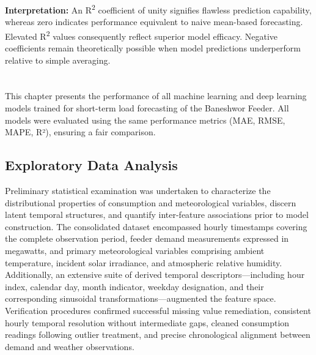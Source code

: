 \documentclass[oneside, 12pt]{book}
\numberwithin{equation}{chapter}
\newcommand{\sizexii}{\fontsize{12pt}{6pt}\selectfont}
\begin{document}
\textbf{Interpretation:} An R\textsuperscript{2} coefficient of unity signifies flawless prediction capability, whereas zero indicates performance equivalent to naive mean-based forecasting. Elevated R\textsuperscript{2} values consequently reflect superior model efficacy. Negative coefficients remain theoretically possible when model predictions underperform relative to simple averaging.




\chapter*{\vspace{-1in}\centering {\sizexii CHAPTER FOUR: RESULTS AND DISCUSSION}}
\setcounter{chapter}{4}
\setcounter{section}{0}
\setcounter{equation}{0}
\setcounter{figure}{0}
\setcounter{table}{0}
\vspace{-12pt}

This chapter presents the performance of all machine learning and deep learning models trained for short-term load forecasting of the Baneshwor Feeder. All models were evaluated using the same performance metrics (MAE, RMSE, MAPE, R²), ensuring a fair comparison.

\section{\sizexii Exploratory Data Analysis}

Preliminary statistical examination was undertaken to characterize the distributional properties of consumption and meteorological variables, discern latent temporal structures, and quantify inter-feature associations prior to model construction. The consolidated dataset encompassed hourly timestamps covering the complete observation period, feeder demand measurements expressed in megawatts, and primary meteorological variables comprising ambient temperature, incident solar irradiance, and atmospheric relative humidity. Additionally, an extensive suite of derived temporal descriptors---including hour index, calendar day, month indicator, weekday designation, and their corresponding sinusoidal transformations---augmented the feature space. Verification procedures confirmed successful missing value remediation, consistent hourly temporal resolution without intermediate gaps, cleaned consumption readings following outlier treatment, and precise chronological alignment between demand and weather observations.
\end{document}
